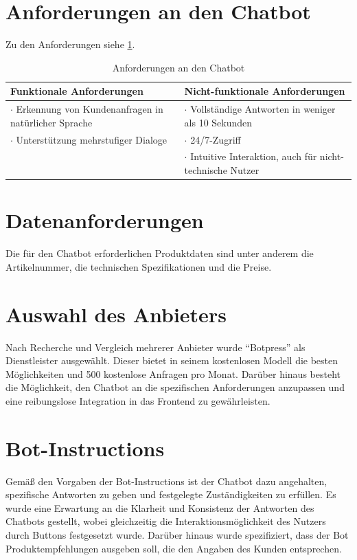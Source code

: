 \documentclass[%
	12pt,
	a4paper,
	oneside,
	parskip=full
]{scrbook}
\begin{document}
\section{Anforderungen an den Chatbot}
Zu den Anforderungen siehe \cref{tab:Anforderungen an den Chatbot}.
\begin{table}[!ht]
	\centering
	\begin{tabularx}{\textwidth}{X|X}
		Funktionale Anforderungen&Nicht-funktionale Anforderungen\\ \hline \hline
		$\cdot$ Erkennung von Kundenanfragen in natürlicher Sprache & $\cdot$ Vollständige Antworten in weniger als 10 Sekunden\\
		$\cdot$ Unterstützung mehrstufiger Dialoge & $\cdot$ 24/7-Zugriff\\
		\times & $\cdot$ Intuitive Interaktion, auch für nicht-technische Nutzer\\
	\end{tabularx}
	\caption{Anforderungen an den Chatbot}
	\label{tab:Anforderungen an den Chatbot}
\end{table}
\section{Datenanforderungen}
Die für den Chatbot erforderlichen Produktdaten sind unter anderem die Artikelnummer, die technischen Spezifikationen und die Preise.
\section{Auswahl des Anbieters}
Nach Recherche und Vergleich mehrerer Anbieter wurde \enquote{Botpress} als Dienstleister ausgewählt. 
Dieser bietet in seinem kostenlosen Modell die besten Möglichkeiten und 500 kostenlose Anfragen pro Monat.
Darüber hinaus besteht die Möglichkeit, den Chatbot an die spezifischen Anforderungen anzupassen und eine reibungslose Integration in das Frontend zu gewährleisten.
\section{Bot-Instructions}
Gemäß den Vorgaben der Bot-Instructions ist der Chatbot dazu angehalten, spezifische Antworten zu geben und festgelegte Zuständigkeiten zu erfüllen. Es wurde eine Erwartung an die Klarheit und Konsistenz der Antworten des Chatbots gestellt, wobei gleichzeitig die Interaktionsmöglichkeit des Nutzers durch Buttons festgesetzt wurde. Darüber hinaus wurde spezifiziert, dass der Bot Produktempfehlungen ausgeben soll, die den Angaben des Kunden entsprechen. 
\end{document}
